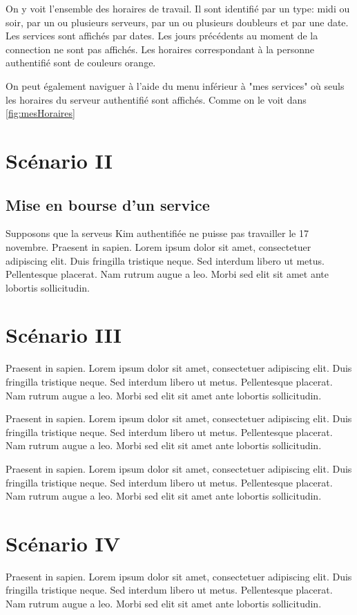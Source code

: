 On y voit l'ensemble des horaires de travail. Il sont identifié par un type: midi ou soir, par un ou plusieurs 
serveurs, par un ou plusieurs doubleurs et par une date. Les services sont affichés par dates.
Les jours précédents au moment de la connection ne 
sont pas affichés. Les horaires correspondant à la personne authentifié sont de couleurs orange.

On peut également naviguer à l'aide du menu inférieur à "mes services" où seuls les horaires du serveur authentifié sont affichés. Comme on le voit 
dans \ref{fig:mesHoraires}

\section{Scénario II}
    \subsection*{Mise en bourse d'un service}
    Supposons que la serveus Kim authentifiée ne puisse pas travailler le 17 novembre.
    Praesent in sapien. Lorem ipsum dolor sit amet, consectetuer 
adipiscing elit. Duis fringilla tristique neque. Sed interdum 
libero ut metus. Pellentesque placerat. Nam rutrum augue a leo. 
Morbi sed elit sit amet ante lobortis sollicitudin.
\section{Scénario III}
Praesent in sapien. Lorem ipsum dolor sit amet, consectetuer 
adipiscing elit. Duis fringilla tristique neque. Sed interdum 
libero ut metus. Pellentesque placerat. Nam rutrum augue a leo. 
Morbi sed elit sit amet ante lobortis sollicitudin.

Praesent in sapien. Lorem ipsum dolor sit amet, consectetuer 
adipiscing elit. Duis fringilla tristique neque. Sed interdum 
libero ut metus. Pellentesque placerat. Nam rutrum augue a leo. 
Morbi sed elit sit amet ante lobortis sollicitudin.

Praesent in sapien. Lorem ipsum dolor sit amet, consectetuer 
adipiscing elit. Duis fringilla tristique neque. Sed interdum 
libero ut metus. Pellentesque placerat. Nam rutrum augue a leo. 
Morbi sed elit sit amet ante lobortis sollicitudin.
\section{Scénario IV}
Praesent in sapien. Lorem ipsum dolor sit amet, consectetuer 
adipiscing elit. Duis fringilla tristique neque. Sed interdum 
libero ut metus. Pellentesque placerat. Nam rutrum augue a leo. 
Morbi sed elit sit amet ante lobortis sollicitudin.


